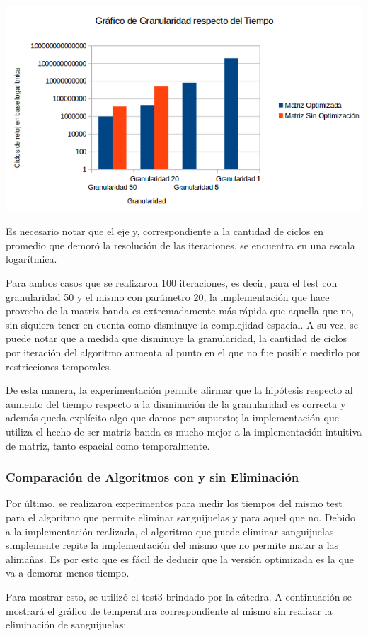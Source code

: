 	\par 
	\begin{center}
		\includegraphics[scale=0.7]{./img/granularidad/granularidadrespectotiempo.png}
	\end{center}
	
	\par 
	Es necesario notar que el eje y, correspondiente a la cantidad de ciclos en promedio que demoró la resolución de las iteraciones, se encuentra en una escala logarítmica. 
	\par 
	Para ambos casos que se realizaron 100 iteraciones, es decir, para el test con granularidad 50 y el mismo con parámetro 20, la implementación que hace provecho de la matriz banda es extremadamente más rápida que aquella que no, sin siquiera tener en cuenta como disminuye la complejidad espacial. A su vez, se puede notar que a medida que disminuye la granularidad, la cantidad de ciclos por iteración del algoritmo aumenta al punto en el que no fue posible medirlo por restricciones temporales. 
	\par 
	De esta manera, la experimentación permite afirmar que la hipótesis respecto al aumento del tiempo respecto a la disminución de la granularidad es correcta y además queda explícito algo que damos por supuesto; la implementación que utiliza el hecho de ser matriz banda es mucho mejor a la implementación intuitiva de matriz, tanto espacial como temporalmente.
	
	\par 
	
\subsubsection{Comparación de Algoritmos con y sin Eliminación}
	Por último, se realizaron experimentos para medir los tiempos del mismo test para el algoritmo que permite eliminar sanguijuelas y para aquel que no. 
	Debido a la implementación realizada, el algoritmo que puede eliminar sanguijuelas simplemente repite la implementación del mismo que no permite matar a las alimañas. Es por esto que es fácil de deducir que la versión optimizada es la que va a demorar menos tiempo. 
	\par 
	Para mostrar esto, se utilizó el test3 brindado por la cátedra. A continuación se mostrará el gráfico de temperatura correspondiente al mismo sin realizar la eliminación de sanguijuelas:
	
